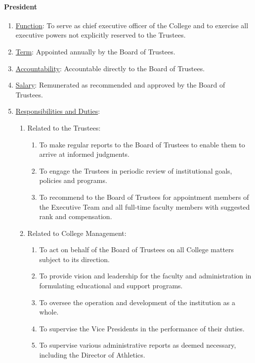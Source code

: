 			\paragraph{President}
				\begin{enumerate}
					\item{\underline{Function}: To serve as chief executive officer of the College and to exercise all executive powers not explicitly reserved to the Trustees.  }
					\item{\underline{Term}: Appointed annually by the Board of Trustees.  }
					\item{\underline{Accountability}: Accountable directly to the Board of Trustees.  }
					\item{\underline{Salary}: Remunerated as recommended and approved by the Board of Trustees.  }
					\item{\underline{Responsibilities and Duties}:
						\begin{enumerate}
							\item{Related to the Trustees:
								\begin{enumerate}
									\item{To make regular reports to the Board of Trustees to enable them to arrive at informed judgments.}
									\item{To engage the Trustees in periodic review of institutional goals, policies and programs.}
									\item{To recommend to the Board of Trustees for appointment members of the Executive Team and all full-time faculty members with suggested rank and compensation.}
								\end{enumerate}
							}
							\item{Related to College Management:
								\begin{enumerate}
									\item{To act on behalf of the Board of Trustees on all College matters subject to its direction.}
									\item{To provide vision and leadership for the faculty and administration in formulating educational and support programs.}
									\item{To oversee the operation and development of the institution as a whole.}
									\item{To supervise the Vice Presidents in the performance of their duties.}
									\item{To supervise various administrative reports as deemed necessary, including the Director of Athletics.}

\end{enumerate}}
\end{enumerate}}
\end{enumerate}
